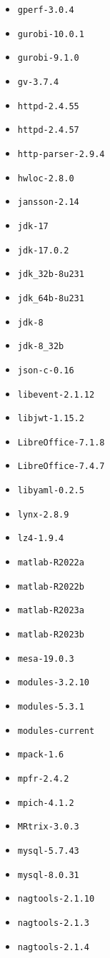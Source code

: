 \begin{multicols}{3}
\begin{itemize}
\item \verb|gperf-3.0.4|
\item \verb|gurobi-10.0.1|
\item \verb|gurobi-9.1.0|
\item \verb|gv-3.7.4|
\item \verb|httpd-2.4.55|
\item \verb|httpd-2.4.57|
\item \verb|http-parser-2.9.4|
\item \verb|hwloc-2.8.0|
\item \verb|jansson-2.14|
\item \verb|jdk-17|
\item \verb|jdk-17.0.2|
\item \verb|jdk_32b-8u231|
\item \verb|jdk_64b-8u231|
\item \verb|jdk-8|
\item \verb|jdk-8_32b|
\item \verb|json-c-0.16|
\item \verb|libevent-2.1.12|
\item \verb|libjwt-1.15.2|
\item \verb|LibreOffice-7.1.8|
\item \verb|LibreOffice-7.4.7|
\item \verb|libyaml-0.2.5|
\item \verb|lynx-2.8.9|
\item \verb|lz4-1.9.4|
\item \verb|matlab-R2022a|
\item \verb|matlab-R2022b|
\item \verb|matlab-R2023a|
\item \verb|matlab-R2023b|
\item \verb|mesa-19.0.3|
\item \verb|modules-3.2.10|
\item \verb|modules-5.3.1|
\item \verb|modules-current|
\item \verb|mpack-1.6|
\item \verb|mpfr-2.4.2|
\item \verb|mpich-4.1.2|
\item \verb|MRtrix-3.0.3|
\item \verb|mysql-5.7.43|
\item \verb|mysql-8.0.31|
\item \verb|nagtools-2.1.10|
\item \verb|nagtools-2.1.3|
\item \verb|nagtools-2.1.4|

\end{itemize}
\end{multicols}
